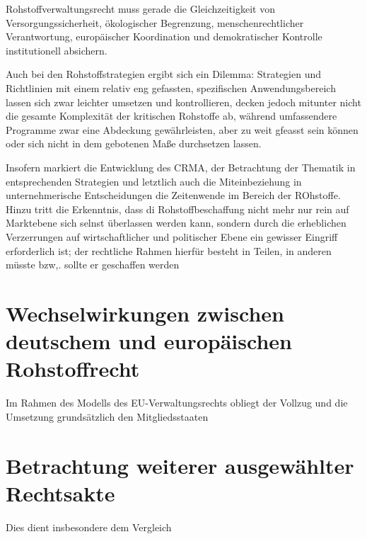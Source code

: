 \documentclass[12pt,a4paper,oneside]{book} %
\begin{document}
Rohstoffverwaltungsrecht muss gerade die Gleichzeitigkeit von Versorgungssicherheit, ökologischer Begrenzung, menschenrechtlicher Verantwortung, europäischer Koordination und demokratischer Kontrolle institutionell absichern.

Auch bei den Rohstoffstrategien ergibt sich ein Dilemma: Strategien und Richtlinien mit einem relativ eng gefassten, spezifischen Anwendungsbereich lassen sich zwar leichter umsetzen und kontrollieren, decken jedoch mitunter nicht die gesamte Komplexität der kritischen Rohstoffe ab, während umfassendere Programme zwar eine Abdeckung gewährleisten, aber zu weit gfeasst sein können oder sich nicht in dem gebotenen Maße durchsetzen lassen.\autocite[Siehe auch]{Resilience of Critical Minerals Supply Chain, Cambirdge, S. 25} 

Insofern markiert die Entwicklung des CRMA, der Betrachtung der Thematik in entsprechenden Strategien und letztlich auch die Miteinbeziehung in unternehmerische Entscheidungen die Zeitenwende im Bereich der ROhstoffe. Hinzu tritt die Erkenntnis, dass di Rohstoffbeschaffung nicht mehr nur rein auf Marktebene sich selnst überlassen werden kann, sondern durch die erheblichen Verzerrungen auf wirtschaftlicher und politischer Ebene ein gewisser Eingriff erforderlich ist; der rechtliche Rahmen hierfür besteht in Teilen, in anderen müsste bzw,. sollte er geschaffen werden

\section{Wechselwirkungen zwischen deutschem und europäischen Rohstoffrecht}
Im Rahmen des Modells des EU-Verwaltungsrechts obliegt der Vollzug und die Umsetzung grundsätzlich den Mitgliedsstaaten

\section{Betrachtung weiterer ausgewählter Rechtsakte}

Dies dient insbesondere dem Vergleich 
\end{document}
